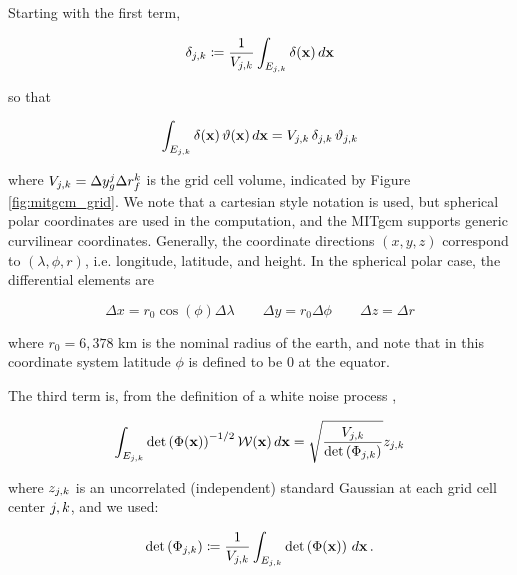 Starting with the first term,
\begin{linenomath*}\begin{equation*}
    \delta_{j,k} \coloneqq \dfrac{1}{V_{j,k}}\int_{E_{j,k}}\delta(\mathbf{x})\,d\mathbf{x}
\end{equation*}\end{linenomath*}
so that
\begin{linenomath*}\begin{equation*}
    \int_{E_{j,k}} \delta(\mathbf{x})\,\vartheta(\mathbf{x})\, d\mathbf{x} =
    V_{j,k}\,\delta_{j,k}\,\vartheta_{j,k}
\end{equation*}\end{linenomath*}
where $V_{j,k} = \Delta y^{j}_{g} \Delta r_f^k$ is the grid cell volume,
indicated by Figure \ref{fig:mitgcm_grid}.
We note that a cartesian style notation
is used, but spherical polar coordinates are used in the computation, and the
MITgcm supports generic curvilinear coordinates.
Generally, the coordinate directions $(x,y,z)$ correspond to $(\lambda,\phi,r)$,
i.e. longitude, latitude, and height.
In the spherical polar case, the differential elements are
\begin{linenomath*}\begin{equation*}
    \Delta x = r_0 \cos(\phi)\Delta\lambda \qquad
    \Delta y = r_0 \Delta \phi \qquad
    \Delta z = \Delta r
\end{equation*}\end{linenomath*}
where $r_0 = 6,378$ km is the nominal radius of the earth, and note that in this
coordinate system latitude $\phi$ is defined to be 0 at the equator.

The third term is, from the definition of a white noise process
\citep{adler_random_2007},
\begin{linenomath*}\begin{equation*}
    \int_{E_{j,k}}\text{det}\left(\Phi(\mathbf{x})\right)^{-1/2}\mathcal{W}(\mathbf{x}) \, d\mathbf{x}
        = \sqrt{\dfrac{V_{j,k}}{\text{det}\left(\Phi_{{j,k}}\right)}} z_{j,k}
\end{equation*}\end{linenomath*}
where $z_{j,k}$ is an uncorrelated (independent) standard Gaussian at each grid
cell center ${j,k}$, and we used:
\begin{linenomath*}\begin{equation*}
    \text{det}\left(\Phi_{{j,k}}\right) \coloneqq
    \dfrac{1}{V_{j,k}}\int_{E_{j,k}}\text{det}\left(\Phi(\mathbf{x})\right)\,d\mathbf{x}\,.
\end{equation*}\end{linenomath*}

